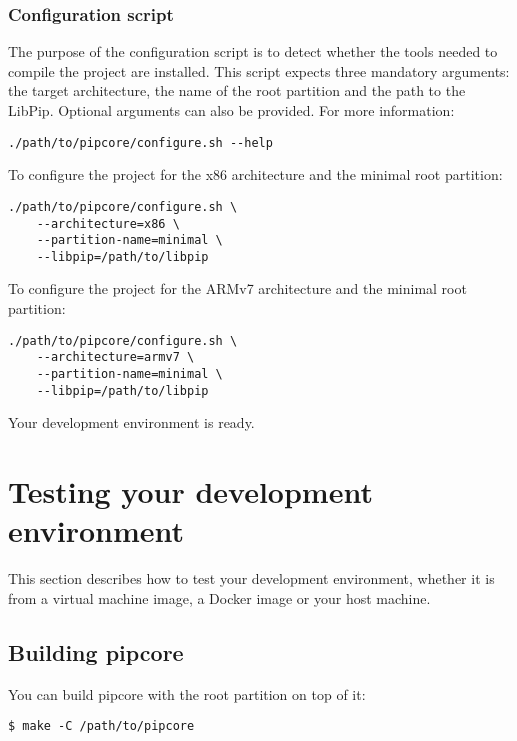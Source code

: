 \documentclass[10pt,a4paper,titlepage]{refart}
\begin{document}
\subsubsection{Configuration script}

The purpose of the configuration script is to detect whether the tools needed to
compile the project are installed. This script expects three mandatory
arguments: the target architecture, the name of the root partition and the path
to the LibPip. Optional arguments can also be provided. For more information:

\begin{lstlisting}[style=BashStyle]
./path/to/pipcore/configure.sh --help
\end{lstlisting}

To configure the project for the x86 architecture and the minimal root
partition:

\begin{lstlisting}[style=BashStyle]
./path/to/pipcore/configure.sh \
    --architecture=x86 \
    --partition-name=minimal \
    --libpip=/path/to/libpip
\end{lstlisting}

To configure the project for the ARMv7 architecture and the minimal root
partition:

\begin{lstlisting}[style=BashStyle]
./path/to/pipcore/configure.sh \
    --architecture=armv7 \
    --partition-name=minimal \
    --libpip=/path/to/libpip
\end{lstlisting}

Your development environment is ready.

\section{Testing your development environment}

This section describes how to test your development environment, whether it is
from a virtual machine image, a Docker image or your host machine.

\subsection{Building pipcore}

You can build pipcore with the root partition on top of it:

\begin{lstlisting}[style=BashStyle]
    $ make -C /path/to/pipcore
\end{lstlisting}
\end{document}
